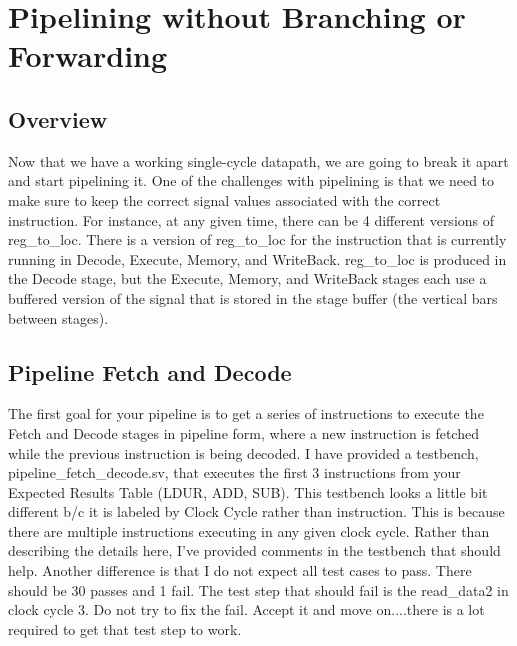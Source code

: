 \chapter{Pipelining without Branching or Forwarding}

\section{Overview}
Now that we have a working single-cycle datapath, we are going to break it apart and start pipelining it.  One of the challenges with pipelining is that we need to make sure to keep the correct signal values associated with the correct instruction.  For instance, at any given time, there can be 4 different versions of reg\_to\_loc.  There is a version of reg\_to\_loc for the instruction that is currently running in Decode, Execute, Memory, and WriteBack.  reg\_to\_loc is produced in the Decode stage, but the Execute, Memory, and WriteBack stages each use a buffered version of the signal that is stored in the stage buffer (the vertical bars between stages).    

\section{Pipeline Fetch and Decode}
The first goal for your pipeline is to get a series of instructions to execute the Fetch and Decode stages in pipeline form, where a new instruction is fetched while the previous instruction is being decoded.  I have provided a testbench, pipeline\_fetch\_decode.sv, that executes the first 3 instructions from your Expected Results Table (LDUR, ADD, SUB).  This testbench looks a little bit different b/c it is labeled by Clock Cycle rather than instruction.  This is because there are multiple instructions executing in any given clock cycle.  Rather than describing the details here, I've provided comments in the testbench that should help.  Another difference is that I do not expect all test cases to pass.  There should be 30 passes and 1 fail. The test step that should fail is the read\_data2 in clock cycle 3.  Do not try to fix the fail.  Accept it and move on....there is a lot required to get that test step to work.    

